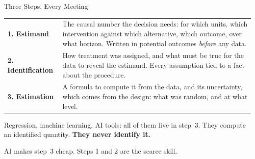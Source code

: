 \documentclass[aspectratio=169, 11pt, handout]{beamer}
\newcommand{\spinestep}[1]{\textcolor{sbgreen}{\textbf{#1}}}
\begin{document}
\begin{frame}{Three Steps, Every Meeting}

\begin{center}
\begin{tabular}{p{3.0cm}p{9.6cm}}
\toprule
\spinestep{1. Estimand} & The causal number the decision needs: for which units, which intervention against which alternative, which outcome, over what horizon. Written in potential outcomes \emph{before} any data. \\[0.5em]
\spinestep{2. Identification} & How treatment was assigned, and what must be true for the data to reveal the estimand. Every assumption tied to a fact about the procedure. \\[0.5em]
\spinestep{3. Estimation} & A formula to compute it from the data, and its uncertainty, which comes from the design: what was random, and at what level. \\
\bottomrule
\end{tabular}
\end{center}

\bigskip

Regression, machine learning, AI tools: all of them live in step~3. They compute an identified quantity. \textbf{They never identify it.}

\medskip

\small AI makes step~3 cheap. Steps 1 and 2 are the scarce skill.
\end{frame}
\end{document}
